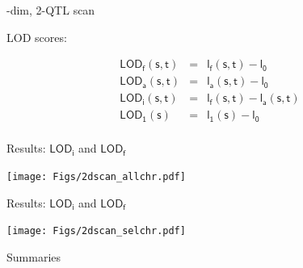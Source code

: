 \documentclass[12pt]{article}
\newcommand{\headsize}{\fontsize{35}{35} \selectfont}
\newcommand{\smallsize}{\fontsize{25}{30} \selectfont}
\newcommand{\lod}{\text{LOD}}
\begin{document}
\newpage

\headsize \color{myyellow}
\hfill \begin{minipage}{5.75in}
-dim, 2-QTL scan 
\end{minipage}

\vspace{2cm}

\color{mywhite} \smallsize

\hfill \begin{minipage}[t]{10in}
LOD scores:

\vspace{5mm}

\hspace{1cm}
\begin{minipage}{5in}
{\color{myblue}
\begin{eqnarray*}
\mathsf{\lod_f(s,t)}& = &\mathsf{l_f(s,t) - l_0} \\[24pt]
\mathsf{\lod_a(s,t)}& = &\mathsf{l_a(s,t) - l_0} \\[24pt]
\mathsf{\lod_i(s,t)}& = &\mathsf{l_f(s,t) - l_a(s,t)} \\[24pt]
\mathsf{\lod_1(s)}&   = &\mathsf{l_1(s) - l_0} \\[24pt]
\end{eqnarray*}
}
\end{minipage}



\end{minipage}


\newpage

\headsize \color{myyellow}
\hfill \begin{minipage}{5.75in}
\centering
Results: $\mathsf{\lod_i}$ and $\mathsf{\lod_f}$
\end{minipage}

\vfill 

\centerline{\texttt{[image: Figs/2dscan\_allchr.pdf]}}

\newpage

\headsize \color{myyellow}
\hfill \begin{minipage}{5.75in}
\centering
Results: $\mathsf{\lod_i}$ and $\mathsf{\lod_f}$
\end{minipage}

\vfill 

\centerline{\texttt{[image: Figs/2dscan\_selchr.pdf]}}

\newpage

\headsize \color{myyellow}
\hfill \begin{minipage}{5.75in}
\centering
Summaries
\end{minipage}
\end{document}

